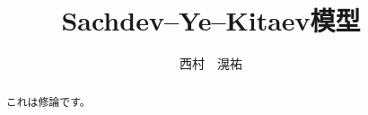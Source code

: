 \title{Sachdev--Ye--Kitaev模型}
\author{西村　滉祐}
\date{}
\maketitle

\begin{abstract}
	これは修論です。
\end{abstract}
\pagebreak